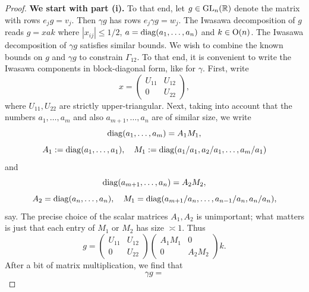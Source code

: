 \documentclass[reqno]{amsart} 
\begin{document}
\begin{proof} {\bf We start with part (i).}
  To that end, let $g \in \operatorname{GL}_n(\mathbb{R})$ denote the matrix with rows $e_j g = v_j$.  Then $\gamma g$ has rows $e_j \gamma g = w_j$.  The Iwasawa decomposition of $g$ reads $g = x a k$ where $|x_{i j}| \leq 1/2$, $a = \operatorname{diag}(a_1,\dotsc,a_n)$ and $k \in \operatorname{O}(n)$.  The Iwasawa decomposition of $\gamma g$ satisfies similar bounds.  We wish to combine the known bounds on $g$ and $\gamma g$ to constrain $\Gamma_{12}$.  To that end, it is convenient to write the Iwasawa components in block-diagonal form, like for $\gamma$.  First, write
  \begin{equation*}
    x = 
    \begin{pmatrix}
      U_{ 1 1}  &  U_{1 2} \\
      0 & U_{2 2}
    \end{pmatrix}
    ,
  \end{equation*}
  where $U_{1 1}, U_{2 2}$ are strictly upper-triangular.  Next, taking into account that the numbers $a_1,\dotsc,a_m$ and also $a_{m+1},\dotsc,a_n$ are of similar size, we write
  \begin{equation*}
    \operatorname{diag}(a_1,\dotsc,a_m) = A_1 M_1,
  \end{equation*}
  \begin{equation*}
    A_1 := \operatorname{diag}(a_1,\dotsc,a_1), \quad M_1 := \operatorname{diag}(a_1/a_1,a_2/a_1,\dotsc,a_m/a_1)
  \end{equation*}
  and
  \begin{equation*}
    \operatorname{diag}(a_{m+1},\dotsc,a_n) = A_2 M_2,
  \end{equation*}
  \begin{equation*}
    A_2 = \operatorname{diag}(a_{n},\dotsc,a_n), \quad M_1 = \operatorname{diag}(a_{m+1}/a_n,\dotsc,a_{n-1}/a_n,a_n/a_n),
  \end{equation*}
  say.  The precise choice of the scalar matrices $A_1,A_2$ is unimportant; what matters is just that each entry of $M_1$ or $M_2$ has size $\asymp 1$.  Thus
  \begin{equation*}
    g = 
    \begin{pmatrix}
      U_{11} & U_{1 2} \\
      0 & U_{2 2}
    \end{pmatrix}
    \begin{pmatrix}
      A_1 M_1 & 0 \\
      0 & A_2 M_2
    \end{pmatrix}
    k.
  \end{equation*}
  After a bit of matrix multiplication, we find that
  \begin{equation*}
    \gamma g =

\end{equation*}
\end{proof}
\end{document}
